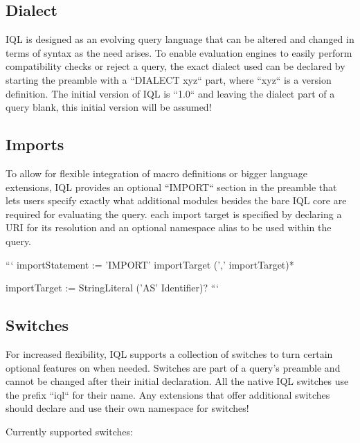 \documentclass[11pt]{article}
\begin{document}
\subsection{Dialect}
\label{sec:dialect}

IQL is designed as an evolving query language that can be altered and changed in terms of syntax as the need arises. To enable evaluation engines to easily perform compatibility checks or reject a query, the exact dialect used can be declared by starting the preamble with a ``DIALECT xyz`` part, where ``xyz`` is a version definition.
The initial version of IQL is ``1.0`` and leaving the dialect part of a query blank, this initial version will be assumed!

\subsection{Imports}
\label{sec:imports}

To allow for flexible integration of macro definitions or bigger language extensions, IQL provides an optional ``IMPORT`` section in the preamble that lets users specify exactly what additional modules besides the bare IQL core are required for evaluating the query. each import target is specified by declaring a URI for its resolution and an optional namespace alias to be used within the query.

```
importStatement := 'IMPORT' importTarget (',' importTarget)*

importTarget := StringLiteral ('AS' Identifier)?
``` 

\subsection{Switches}
\label{sec:switches}

For increased flexibility, IQL supports a collection of switches to turn certain optional features on when needed. Switches are part of a query's preamble and cannot be changed after their initial declaration. All the native IQL switches use the prefix ``iql`` for their name. Any extensions that offer additional switches should declare and use their own namespace for switches!

Currently supported switches:
\end{document}
